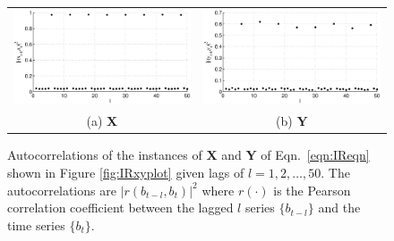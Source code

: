 \documentclass{article}[10pt]
\begin{document}
\begin{figure}[ht]
\begin{tabular}{cc}
\includegraphics[scale=0.48]{NoisyResponseExample_autocorrX.eps} & \includegraphics[scale=0.48]{NoisyResponseExample_autocorrY.eps} \\
(a) $\mathbf{X}$ & (b) $\mathbf{Y}$
\end{tabular}
\caption{Autocorrelations of the instances of $\mathbf{X}$ and $\mathbf{Y}$ of Eqn.\ \ref{eqn:IReqn} shown in Figure \ref{fig:IRxyplot} given lags of $l=1,2,\ldots,50$.  The autocorrelations are $|r(b_{t-l},b_t)|^2$ where $r(\cdot)$ is the Pearson correlation coefficient between the lagged $l$ series $\{b_{t-l}\}$ and the time series $\{b_{t}\}$.}
\label{fig:IRxyautocorr}
\end{figure}
\end{document}
